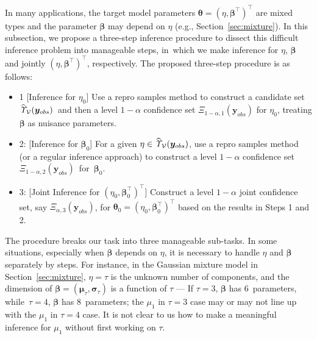 \documentclass[12pt]{article}
\theoremstyle{shortspace}
\def\*#1{\bm{#1}}
\begin{document}
In many applications, 
the target model parameters $\*\theta = (\eta, \*\beta^\top)^\top$ are mixed types and the parameter $\*\beta$ may depend on $\eta$ (e.g., Section~\ref{sec:mixture}). 
In this subsection, we propose a three-step inference procedure to dissect this difficult inference problem into manageable steps, in~which we make inference for $\eta$, $\*\beta$ and jointly $(\eta, \*\beta^\top)^\top$, respectively. 
The proposed three-step 
procedure is as follows: 
\begin{itemize}[leftmargin=2.5em, labelsep=0.3em, 
align=parleft,   itemsep=1pt,
  parsep=0pt,
  topsep=1pt]
\item[Step]1  [Inference for $\eta_0$]  Use a repro samples method to construct a candidate set $\widehat{\it \Upsilon}_{\mathcal V}(\*y_{obs})$~and then a level $1 - \alpha$ confidence set $\Xi_{1-\alpha, 1}(\*y_{obs})$ for $\eta_0$, treating $\*\beta$ as nuisance parameters.
\item[Step]2: [Inference for $\*\beta_0$] For a given $\eta \in 
\widehat{\it \Upsilon}_{\mathcal V}(\*y_{obs})$, use a repro samples method (or a regular inference approach) to construct a level $1 - \alpha$ confidence set $\Xi_{1-\alpha, 2}(\*y_{obs})$~for~$\*\beta_0$.
\item[Step]3: [Joint Inference for $(\eta_0, \*\beta_0^\top)^\top$]
    Construct a level $1 - \alpha$ joint confidence set, say $\Xi_{\alpha, 3}(\*y_{obs})$, for $\*\theta_0 = (\eta_0, \*\beta_0^\top)^\top$ based on the results in Steps 1 and 2. 
\end{itemize}
The procedure breaks our task into three  manageable 
sub-tasks. 
In some situations, especially when $\*\beta$ depends on $\eta$, it is necessary to handle $\eta$ and $\*\beta$ separately by steps. For instance, in the Gaussian mixture model in Section~\ref{sec:mixture}, $\eta = \tau$ is the unknown number of components, and the dimension of $\*\beta = (\*\mu_\tau, \*\sigma_\tau)$ is a function of $\tau$ --- If $\tau =3$, $\*\beta$ has $6$~parameters, while~$\tau = 4$, $\*\beta$ has $8$~parameters; the $\mu_1$ in $\tau =3$ case may or may not line up with the $\mu_1$ in $\tau =4$ case. It is not clear to us how to make a meaningful inference for $\mu_1$ without first working on $\tau$. 
\end{document}
